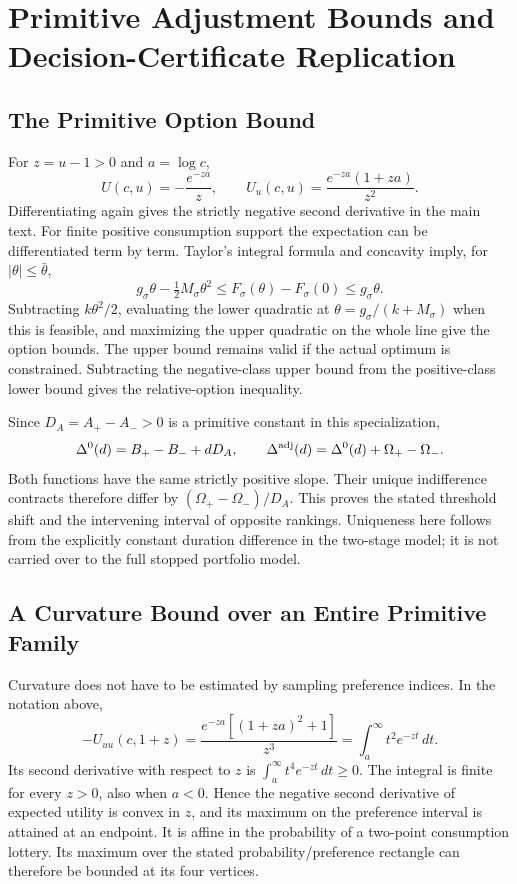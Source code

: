 \section{Primitive Adjustment Bounds and Decision-Certificate Replication}
\subsection{The Primitive Option Bound}
For $z=u-1>0$ and $a=\log c$,
\[
 U(c,u)=-\frac{e^{-za}}z,
 \qquad U_u(c,u)=\frac{e^{-za}(1+za)}{z^2}.
\]
Differentiating again gives the strictly negative second derivative in the main text. For finite positive consumption support the expectation can be differentiated term by term. Taylor's integral formula and concavity imply, for $|\theta|\leq\bar\theta$,
\[
 g_\sigma\theta-\tfrac12 M_\sigma\theta^2
 \leq F_\sigma(\theta)-F_\sigma(0)\leq g_\sigma\theta.
\]
Subtracting $k\theta^2/2$, evaluating the lower quadratic at
$\theta=g_\sigma/(k+M_\sigma)$ when this is feasible, and maximizing the upper quadratic on the whole line give the option bounds. The upper bound remains valid if the actual optimum is constrained. Subtracting the negative-class upper bound from the positive-class lower bound gives the relative-option inequality.

Since $D_A=A_+-A_->0$ is a primitive constant in this specialization,
\[
 \Delta^0(d)=B_+-B_-+dD_A,\qquad
 \Delta^{\rm adj}(d)=\Delta^0(d)+\Omega_+-\Omega_-.
\]
Both functions have the same strictly positive slope. Their unique indifference contracts therefore differ by $(\Omega_+-\Omega_-)/D_A$. This proves the stated threshold shift and the intervening interval of opposite rankings. Uniqueness here follows from the explicitly constant duration difference in the two-stage model; it is not carried over to the full stopped portfolio model.

\subsection{A Curvature Bound over an Entire Primitive Family}
Curvature does not have to be estimated by sampling preference indices. In the notation above,
\[
 -U_{uu}(c,1+z)
 =\frac{e^{-za}[(1+za)^2+1]}{z^3}
 =\int_a^\infty t^2e^{-zt}\,dt.
\]
Its second derivative with respect to $z$ is $\int_a^\infty t^4e^{-zt}\,dt\geq0$. The integral is finite for every $z>0$, also when $a<0$. Hence the negative second derivative of expected utility is convex in $z$, and its maximum on the preference interval is attained at an endpoint. It is affine in the probability of a two-point consumption lottery. Its maximum over the stated probability/preference rectangle can therefore be bounded at its four vertices.

